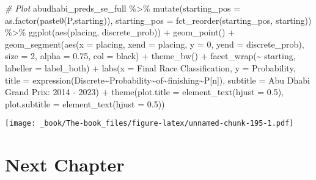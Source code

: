 \documentclass[
]{book}
\newenvironment{Shaded}{\begin{snugshade}}{\end{snugshade}}
\newcommand{\AttributeTok}[1]{\textcolor[rgb]{0.77,0.63,0.00}{#1}}
\newcommand{\CommentTok}[1]{\textcolor[rgb]{0.56,0.35,0.01}{\textit{#1}}}
\newcommand{\DecValTok}[1]{\textcolor[rgb]{0.00,0.00,0.81}{#1}}
\newcommand{\FloatTok}[1]{\textcolor[rgb]{0.00,0.00,0.81}{#1}}
\newcommand{\FunctionTok}[1]{\textcolor[rgb]{0.00,0.00,0.00}{#1}}
\newcommand{\NormalTok}[1]{#1}
\newcommand{\SpecialCharTok}[1]{\textcolor[rgb]{0.00,0.00,0.00}{#1}}
\newcommand{\StringTok}[1]{\textcolor[rgb]{0.31,0.60,0.02}{#1}}
\begin{document}
\begin{Shaded}
\begin{Highlighting}[]
\CommentTok{\# Plot}
\NormalTok{abudhabi\_preds\_se\_full }\SpecialCharTok{\%\textgreater{}\%}
  \FunctionTok{mutate}\NormalTok{(}\AttributeTok{starting\_pos =} \FunctionTok{as.factor}\NormalTok{(}\FunctionTok{paste0}\NormalTok{(}\StringTok{\textquotesingle{}P\textquotesingle{}}\NormalTok{,starting)),}
         \AttributeTok{starting\_pos =} \FunctionTok{fct\_reorder}\NormalTok{(starting\_pos, starting)) }\SpecialCharTok{\%\textgreater{}\%}
  \FunctionTok{ggplot}\NormalTok{(}\FunctionTok{aes}\NormalTok{(placing, discrete\_prob)) }\SpecialCharTok{+}
  \FunctionTok{geom\_point}\NormalTok{() }\SpecialCharTok{+}
  \FunctionTok{geom\_segment}\NormalTok{(}\FunctionTok{aes}\NormalTok{(}\AttributeTok{x =}\NormalTok{ placing, }\AttributeTok{xend =}\NormalTok{ placing, }\AttributeTok{y =} \DecValTok{0}\NormalTok{, }\AttributeTok{yend =}\NormalTok{ discrete\_prob),}
               \AttributeTok{size =} \DecValTok{2}\NormalTok{, }\AttributeTok{alpha =} \FloatTok{0.75}\NormalTok{, }\AttributeTok{col =} \StringTok{\textquotesingle{}black\textquotesingle{}}\NormalTok{) }\SpecialCharTok{+}
  \FunctionTok{theme\_bw}\NormalTok{() }\SpecialCharTok{+}
  \FunctionTok{facet\_wrap}\NormalTok{(}\SpecialCharTok{\textasciitilde{}}\NormalTok{ starting, }\AttributeTok{labeller =}\NormalTok{ label\_both) }\SpecialCharTok{+}
  \FunctionTok{labs}\NormalTok{(}\AttributeTok{x =} \StringTok{\textquotesingle{}Final Race Classification\textquotesingle{}}\NormalTok{,}
       \AttributeTok{y =} \StringTok{\textquotesingle{}Probability\textquotesingle{}}\NormalTok{,}
       \AttributeTok{title =} \FunctionTok{expression}\NormalTok{(Discrete}\SpecialCharTok{\textasciitilde{}}\NormalTok{Probability}\SpecialCharTok{\textasciitilde{}}\NormalTok{of}\SpecialCharTok{\textasciitilde{}}\NormalTok{finishing}\SpecialCharTok{\textasciitilde{}}\NormalTok{P[n]),}
       \AttributeTok{subtitle =} \StringTok{\textquotesingle{}Abu Dhabi Grand Prix: 2014 {-} 2023\textquotesingle{}}\NormalTok{) }\SpecialCharTok{+}
  \FunctionTok{theme}\NormalTok{(}\AttributeTok{plot.title =} \FunctionTok{element\_text}\NormalTok{(}\AttributeTok{hjust =} \FloatTok{0.5}\NormalTok{),}
        \AttributeTok{plot.subtitle =} \FunctionTok{element\_text}\NormalTok{(}\AttributeTok{hjust =} \FloatTok{0.5}\NormalTok{)) }
\end{Highlighting}
\end{Shaded}

\texttt{[image: \_book/The-book\_files/figure-latex/unnamed-chunk-195-1.pdf]}

\hypertarget{next-chapter-4}{%
\section{Next Chapter}\label{next-chapter-4}}
\end{document}
